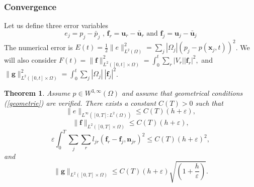 \documentclass[a4paper,french,english,10pt]{article}
\newcommand\ljr{l_{jr}}
\newcommand\njr{\mathbf{n}_{jr}}
\newcommand\uu{\mathbf{u}}
\newcommand\eps{\varepsilon}
\newcommand\xj{\mathbf{x}_j}
\newcommand\pej{\bar{p}_j}
\newcommand\uej{\bar{\uu}_j}
\newcommand\uer{\bar{\uu}_r}
\newcommand\uj{\uu_j}
\newcommand\ur{\uu_r}
\newcommand\fj{\mathbf{f}_j}
\newcommand\fr{\mathbf{f}_r}
\newcommand\ff{\mathbf{f}}
\newcommand\gf{\mathbf{g}}
\newtheorem{theorem}{Theorem}[section]
\begin{document}
\subsubsection*{Convergence}

Let us define three  error variables 
$$
e_j= p_j -\pej
\mbox{ , }
\fr = \ur -\uer
\mbox{ and }
\fj = \uj -\uej
$$ 
The numerical error is 
$
E(t)=\frac12  \| e \|_{L^2(\Omega)}^2=
 \sum_j \left| \Omega_j \right| \left(    p_j
-p(\xj,t)\right)^2 $. 
We will also consider
$
F(t)=
\| \ff \|_{L^2([0,t]\times \Omega)}^2=
 \int_0^t \sum_r \left| V_r \right| |\fr|^2,
$
and 
$
\| \gf \|_{L^2([0,t]\times \Omega)}^2=  \int_0^t
\sum_j
 \left| \Omega_j \right| \   \left| \fj  \right|^2 $.
\begin{theorem} \label{theor:main0}
Assume $p \in W^{3, \infty} (\Omega)$ and assume that geometrical conditions
(\ref{geometrie}) are verified.
There  exists a  constant
$C(T)>0$ such that 
\begin{equation} \label{eq:dconv1}
 \| e \|_{L^\infty(  [0,T]: L^2(\Omega) )}
 \leq C(T)(h+\eps),
\end{equation}
\begin{equation} \label{eq:dconv2}
 \| \ff \|_{L^2([0,T]\times \Omega)} \leq C(T) (h+\eps)  
 ,
\end{equation}
\begin{equation} \label{eq:dconv3}
\eps \int_0^T \sum_j \sum_r    \ljr \left( \fr  -
\fj ,\njr \right)^2\leq C(T) (h+\eps)^2, 
 \end{equation}
and 
\begin{equation} \label{eq:dconv4}
\| \gf \|_{L^2([0,T]\times \Omega)} \leq C(T) (h+\eps)\sqrt{(1+\frac
h\eps )} . 
\end{equation}

\end{theorem}
\end{document}
